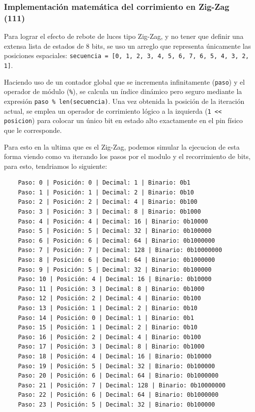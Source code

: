 \documentclass[letterpaper,12pt]{article}
\begin{document}
    \subsubsection{Implementación matemática del corrimiento en Zig-Zag (111)}
    Para lograr el efecto de rebote de luces tipo Zig-Zag, y no tener que definir una extensa lista de estados de 8 bits, se uso un arreglo que representa únicamente las posiciones espaciales: \texttt{secuencia = [0, 1, 2, 3, 4, 5, 6, 7, 6, 5, 4, 3, 2, 1]}. 
    
    Haciendo uso de un contador global que se incrementa infinitamente (\texttt{paso}) y el operador de módulo (\texttt{\%}), se calcula un índice dinámico pero seguro mediante la expresión \texttt{paso \% len(secuencia)}. Una vez obtenida la posición de la iteración actual, se emplea un operador de corrimiento lógico a la izquierda (\texttt{1 << posicion}) para colocar un único bit en estado alto exactamente en el pin físico que le corresponde.

    Para esto en la ultima que es el Zig-Zag, podemos simular la ejecucion de esta forma viendo como va iterando los pasos por el modulo y el recorrimiento de bits, para esto, tendriamos lo siguiente:

    \begin{lstlisting}
    Paso: 0 | Posición: 0 | Decimal: 1 | Binario: 0b1
    Paso: 1 | Posición: 1 | Decimal: 2 | Binario: 0b10
    Paso: 2 | Posición: 2 | Decimal: 4 | Binario: 0b100
    Paso: 3 | Posición: 3 | Decimal: 8 | Binario: 0b1000
    Paso: 4 | Posición: 4 | Decimal: 16 | Binario: 0b10000
    Paso: 5 | Posición: 5 | Decimal: 32 | Binario: 0b100000
    Paso: 6 | Posición: 6 | Decimal: 64 | Binario: 0b1000000
    Paso: 7 | Posición: 7 | Decimal: 128 | Binario: 0b10000000
    Paso: 8 | Posición: 6 | Decimal: 64 | Binario: 0b1000000
    Paso: 9 | Posición: 5 | Decimal: 32 | Binario: 0b100000
    Paso: 10 | Posición: 4 | Decimal: 16 | Binario: 0b10000
    Paso: 11 | Posición: 3 | Decimal: 8 | Binario: 0b1000
    Paso: 12 | Posición: 2 | Decimal: 4 | Binario: 0b100
    Paso: 13 | Posición: 1 | Decimal: 2 | Binario: 0b10
    Paso: 14 | Posición: 0 | Decimal: 1 | Binario: 0b1
    Paso: 15 | Posición: 1 | Decimal: 2 | Binario: 0b10
    Paso: 16 | Posición: 2 | Decimal: 4 | Binario: 0b100
    Paso: 17 | Posición: 3 | Decimal: 8 | Binario: 0b1000
    Paso: 18 | Posición: 4 | Decimal: 16 | Binario: 0b10000
    Paso: 19 | Posición: 5 | Decimal: 32 | Binario: 0b100000
    Paso: 20 | Posición: 6 | Decimal: 64 | Binario: 0b1000000
    Paso: 21 | Posición: 7 | Decimal: 128 | Binario: 0b10000000
    Paso: 22 | Posición: 6 | Decimal: 64 | Binario: 0b1000000
    Paso: 23 | Posición: 5 | Decimal: 32 | Binario: 0b100000

    \end{lstlisting}
    
\end{document}
